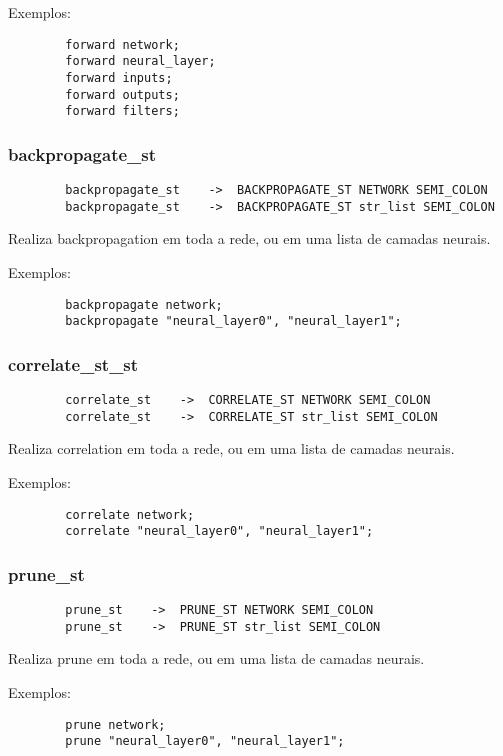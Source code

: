 \documentclass[a4paper,10pt]{article}
\begin{document}
		Exemplos:
		\begin{lstlisting}
		forward network;
		forward neural_layer;
		forward inputs;
		forward outputs;
		forward filters;
		\end{lstlisting}
		\vspace{10mm}
	\subsubsection{backpropagate\_st}
		\begin{lstlisting}
		backpropagate_st	->	BACKPROPAGATE_ST NETWORK SEMI_COLON
		backpropagate_st	->	BACKPROPAGATE_ST str_list SEMI_COLON
		\end{lstlisting}
		Realiza backpropagation em toda a rede, ou em uma lista de camadas neurais.
		
		Exemplos:
		\begin{lstlisting}
		backpropagate network;
		backpropagate "neural_layer0", "neural_layer1";
		\end{lstlisting}
		\vspace{10mm}
	\subsubsection{correlate\_st\_st}
		\begin{lstlisting}
		correlate_st	->	CORRELATE_ST NETWORK SEMI_COLON
		correlate_st	->	CORRELATE_ST str_list SEMI_COLON
		\end{lstlisting}
		Realiza correlation em toda a rede, ou em uma lista de camadas neurais.
		
		Exemplos:
		\begin{lstlisting}
		correlate network;
		correlate "neural_layer0", "neural_layer1";
		\end{lstlisting}
		\vspace{10mm}
	\subsubsection{prune\_st}
		\begin{lstlisting}
		prune_st	->	PRUNE_ST NETWORK SEMI_COLON
		prune_st	->	PRUNE_ST str_list SEMI_COLON
		\end{lstlisting}
		Realiza prune em toda a rede, ou em uma lista de camadas neurais.
		
		Exemplos:
		\begin{lstlisting}
		prune network;
		prune "neural_layer0", "neural_layer1";
		\end{lstlisting}
		\vspace{10mm}
\end{document}
